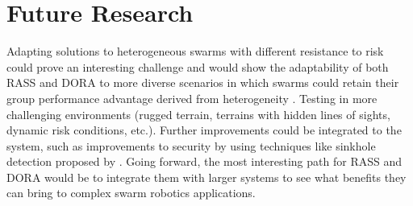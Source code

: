 \section{Future Research}
Adapting solutions to heterogeneous swarms with different resistance to risk could prove an interesting challenge and would show the adaptability of both RASS and DORA to more diverse scenarios in which swarms could retain their group performance advantage derived from heterogeneity \cite{ferrante2015evolution}. Testing in more challenging environments (rugged terrain, terrains with hidden lines of sights, dynamic risk conditions, etc.). Further improvements could be integrated to the system, such as improvements to security by using techniques like sinkhole detection proposed by \cite{abdullah2015detecting}. Going forward, the most interesting path for \ac{RASS} and \ac{DORA} would be to integrate them with larger systems to see what benefits they can bring to complex swarm robotics applications.